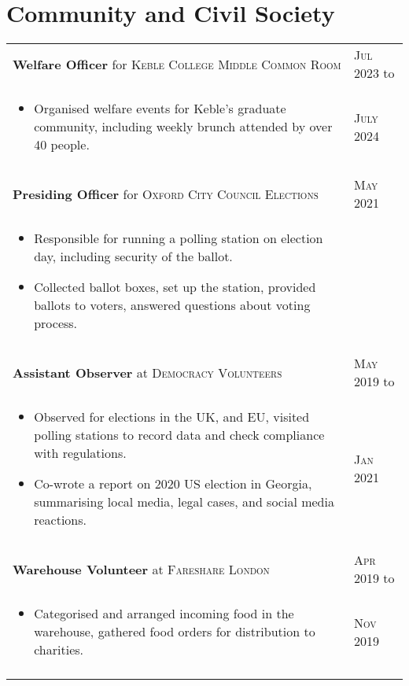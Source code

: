 \documentclass[a4paper,10pt]{article}
\newcommand{\datelen}{1.8cm}
\newcommand{\descrlen}{15.5cm}
\begin{document}
\section{Community and  Civil Society}
\begin{tabular}{p{\descrlen}|p{\datelen}}
  \textbf{Welfare Officer} for \textsc{Keble College Middle Common Room} & \textsc{Jul 2023} to\\
  \small{
  \vspace{-0.4cm}
  \begin{itemize}
  \item Organised welfare events for Keble's graduate community, including weekly brunch attended by over 40 people.
    \vspace{-0.5cm}
  \end{itemize}}&\textsc{July 2024}\\\multicolumn{2}{c}{} \\[-0.2cm]
  \textbf{Presiding Officer} for \textsc{Oxford City Council Elections}&\textsc{May 2021}\\
  \small{
  \vspace{-0.4cm}
  \begin{itemize}
  \item Responsible for running a polling station on election day, including security of the ballot.
  \item Collected ballot boxes, set up the station, provided ballots to voters, answered questions about voting process.
    \vspace{-0.5cm}
  \end{itemize}}&\\\multicolumn{2}{c}{} \\[-0.2cm]
  \textbf{Assistant Observer} at \textsc{Democracy Volunteers} & \textsc{May 2019} to\\
  \small{
  \vspace{-0.4cm}
  \begin{itemize}
  \item Observed for elections in the UK, and EU, visited polling stations to record data and check compliance with regulations.
  \item Co-wrote a report on 2020 US election in Georgia, summarising local media, legal cases, and social media reactions.
  \vspace{-0.5cm}
  \end{itemize}}&\textsc{Jan 2021}\\\multicolumn{2}{c}{} \\[-0.2cm]
  \textbf{Warehouse Volunteer} at \textsc{Fareshare London} & \textsc{Apr 2019} to\\
  \small{
  \vspace{-0.4cm}
  \begin{itemize}
  \item Categorised and arranged incoming food in the warehouse, gathered food orders for distribution to charities.
  \vspace{-0.5cm}
  \end{itemize}}&\textsc{Nov 2019}\\\multicolumn{2}{c}{} \\[-0.2cm]
\end{tabular}
\end{document}
